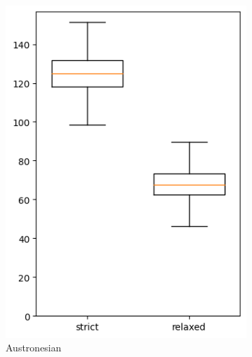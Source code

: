 \documentclass[a4paper,12pt]{scrartcl}
\begin{document}
\begin{figure}
  \centering
  \begin{subfigure}{0.4\textwidth}
    \includegraphics[width=\textwidth]{supplement/analysis/austronesian_years_per_split.png}
    \caption{Austronesian}
  \end{subfigure}
  \begin{subfigure}{0.4\textwidth}

\end{subfigure}
\end{figure}
\end{document}
